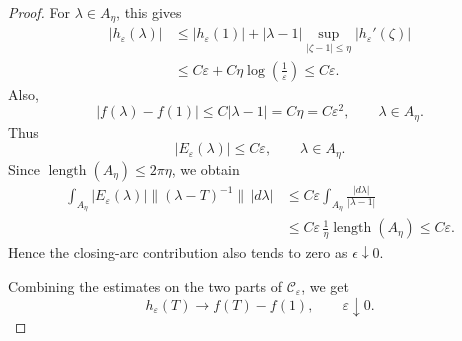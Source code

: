 \documentclass[10pt,a4paper]{amsart}
\begin{document}
\begin{proof}
For \(\lambda\in A_\eta\), this gives
\[
\begin{aligned}
        |h_\varepsilon(\lambda)|
        &\le
        |h_\varepsilon(1)|
        +
        |\lambda-1|
        \sup_{|\zeta-1|\le\eta}|h_\varepsilon'(\zeta)|        \\
        &\le
        C\varepsilon
        +
        C\eta\log \left(\frac{1}{\varepsilon}\right)
        \le
        C\varepsilon .
\end{aligned}
\]
Also,
\[
        |f(\lambda)-f(1)|
        \le C|\lambda-1|
        =
        C\eta
        =
        C\varepsilon^2,
        \qquad \lambda\in A_\eta .
\]
Thus
\[
        |E_\varepsilon(\lambda)|\le C\varepsilon,
        \qquad \lambda\in A_\eta .
\]
Since \(\operatorname{length}(A_\eta)\le 2\pi \eta\), we obtain
\[
\begin{aligned}
        \int_{A_\eta}
        |E_\varepsilon(\lambda)|
        \|(\lambda -T)^{-1}\|\,|d\lambda|
        &\le
        C\varepsilon
        \int_{A_\eta} \frac{|d\lambda|}{|\lambda-1|}        \\
        &\le
        C\varepsilon\, \frac{1}{\eta}\operatorname{length}(A_\eta)
        \le
        C\varepsilon .
\end{aligned}
\]
Hence the closing-arc contribution also tends to zero as \(\epsilon \downarrow 0\).

Combining the estimates on the two parts of
\(\mathcal C_\varepsilon\), we get
\[
        h_\varepsilon(T)\longrightarrow f(T)-f(1), \qquad  \varepsilon\downarrow0. 
\]
\end{proof}
\end{document}

